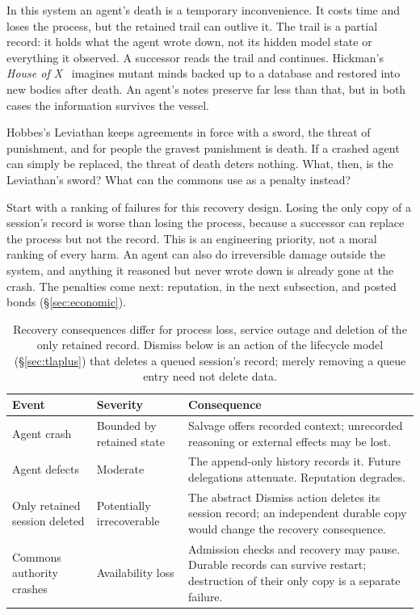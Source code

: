 \documentclass[11pt,a4paper]{article}
\theoremstyle{definition}
\theoremstyle{remark}
\begin{document}
In this system an agent's death is a temporary inconvenience. It costs time and loses the process, but the retained trail can outlive it. The trail is a
partial record: it holds what the agent wrote down, not its hidden model state or everything it observed. A successor reads the trail and continues. Hickman's \emph{House of X}~ imagines mutant minds backed up to a database and restored into new bodies after death. An agent's notes preserve far less than that, but in both cases the information survives the vessel.

Hobbes's Leviathan keeps agreements in force with a sword, the threat of
punishment, and for people the gravest punishment is death. If a crashed agent
can simply be replaced, the threat of death deters nothing. What, then, is the
Leviathan's sword? What can the commons use as a penalty instead?

Start with a ranking of failures for this recovery design. Losing the only
copy of a session's record is worse than losing the process, because a
successor can replace the process but not the record. This is an engineering
priority, not a moral ranking of every harm. An agent can also do
irreversible damage outside the system, and anything it reasoned but never
wrote down is already gone at the crash. The penalties come next: reputation,
in the next subsection, and posted bonds (\S\ref{sec:economic}).

\begin{table}[H]
\centering
\caption{Recovery consequences differ for process loss, service outage and deletion
of the only retained record. Dismiss below is an action of the lifecycle
model (\S\ref{sec:tlaplus}) that deletes a queued session's record; merely
removing a queue entry need not delete data.}
\label{tab:moral}
\begin{tabularx}{\textwidth}{@{}>{\raggedright\arraybackslash}p{}
  >{\raggedright\arraybackslash}p{}
  >{\raggedright\arraybackslash}X@{}}
\toprule
\textbf{Event} & \textbf{Severity} & \textbf{Consequence} \\
\midrule
Agent crash & Bounded by retained state & Salvage offers recorded context;
unrecorded reasoning or external effects may be lost. \\
Agent defects & Moderate & The append-only history records it. Future delegations attenuate. Reputation degrades. \\
Only retained session deleted & Potentially irrecoverable & The abstract
Dismiss action deletes its session record; an independent durable copy would
change the recovery consequence. \\
Commons authority crashes & Availability loss & Admission checks and recovery may pause.
Durable records can survive restart; destruction of their only copy is a separate failure. \\
\bottomrule
\end{tabularx}
\end{table}
\end{document}
